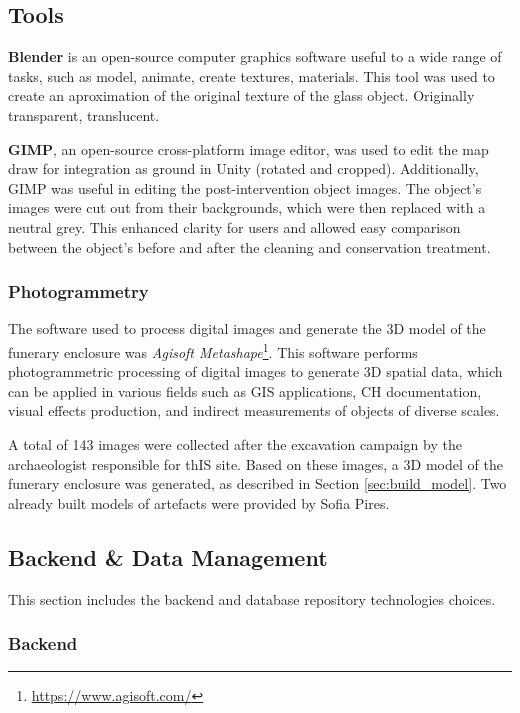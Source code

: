 \subsection{Tools}
\textbf{Blender} is an open-source computer graphics software useful to a wide range of tasks, such as model, animate, create textures, materials. 
This tool was used to create an aproximation of the original texture of the glass object. Originally transparent, translucent.

\textbf{GIMP}, an open-source cross-platform image editor, was used to edit the map draw for integration as ground in Unity (rotated and cropped).
Additionally, GIMP was useful in editing the post-intervention object images. The object's images were cut out from their backgrounds, which were then replaced with a neutral grey. 
This enhanced clarity for users and allowed easy comparison between the object's before and after the cleaning and conservation treatment.

\subsubsection{Photogrammetry}
\label{sec:photogrammetry_tool} 

The software used to process digital images and generate the \gls{3D} model of the funerary enclosure was \textit{Agisoft Metashape}\footnote{\url{https://www.agisoft.com/}}.
This software performs photogrammetric processing of digital images to generate \gls{3D} spatial data, which can be applied in various fields such as \gls{GIS} applications, \gls{CH} documentation, visual effects production, and indirect measurements of objects of diverse scales. 

 A total of 143 images were collected after the excavation campaign by the archaeologist responsible for thIS site.
Based on these images, a \gls{3D} model of the funerary enclosure was generated, as described in Section \ref{sec:build_model}.
Two already built models of artefacts were provided by Sofia Pires.

\subsection{Backend \& Data Management}
This section includes the backend and database repository technologies choices. 
\subsubsection{Backend}

